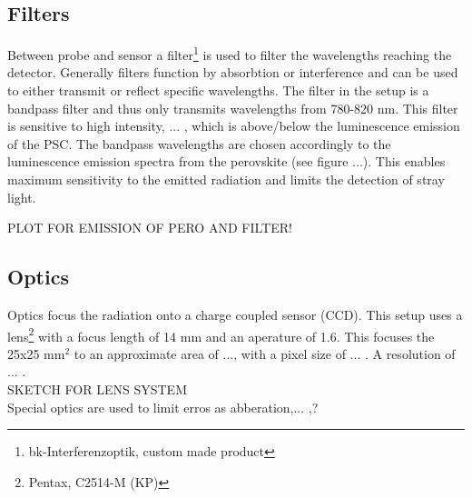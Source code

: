 \subsection{Filters}
Between probe and sensor a filter\footnote{bk-Interferenzoptik, custom made product} is used to filter the wavelengths reaching the detector. Generally filters function by absorbtion or interference and can be used to either transmit or reflect specific wavelengths. The filter in the setup is a bandpass filter and thus only transmits wavelengths from 780-820 nm. This filter is sensitive to high intensity, ... , which is above/below the luminescence emission of the PSC. The bandpass wavelengths are chosen accordingly to the luminescence emission spectra from the perovskite (see figure ...). This enables maximum sensitivity to the emitted radiation and limits the detection of stray light.

PLOT FOR EMISSION OF PERO AND FILTER!
\subsection{Optics}
Optics focus the radiation onto a charge coupled sensor (CCD). This setup uses a lens\footnote{Pentax, C2514-M (KP)} with a focus length of 14 mm and an aperature of 1.6. This focuses the 25x25 mm$^2$ to an approximate area of ..., with a pixel size of ... . A resolution of ... . 
\\
SKETCH FOR LENS SYSTEM
\\
Special optics are used to limit erros as abberation,... ,?

